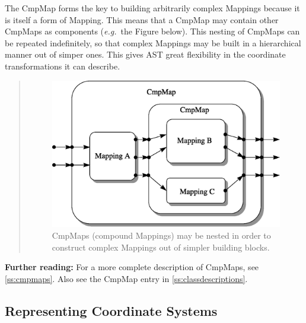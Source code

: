 \documentclass[twoside,11pt]{article}
\newcommand{\appref}[1]{Appendix~\ref{#1}}
\newcommand{\secref}[1]{\S\ref{#1}}
\renewcommand{\appref}[1]{\ref{#1}}
\renewcommand{\secref}[1]{\ref{#1}}
\begin{document}
\begin{htmlonly}
   The CmpMap forms the key to building arbitrarily complex Mappings
   because it is itself a form of Mapping. This means that a CmpMap may
   contain other CmpMaps as components ({\em{e.g.}}\ the Figure
   below). This nesting of CmpMaps can be repeated indefinitely, so that
   complex Mappings may be built in a hierarchical manner out of simper
   ones.  This gives AST great flexibility in the coordinate
   transformations it can describe.
   \begin{quote}
   \begin{figure}
   \label{fig:complexcmpmap}
   \includegraphics[scale=0.8]{sun210_figures/complex.eps}
   \caption{CmpMaps (compound Mappings) may be nested in order to
   construct complex Mappings out of simpler building blocks.}
   \end{figure}
   \end{quote}
\end{htmlonly}

{\bf{Further reading:}} For a more complete description of CmpMaps,
see \secref{ss:cmpmaps}. Also see the CmpMap entry in
\appref{ss:classdescriptions}.

\subsection{Representing Coordinate Systems}
\end{document}
